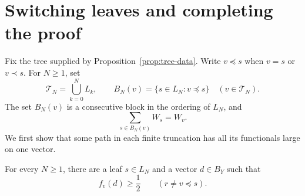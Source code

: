\section{Switching leaves and completing the proof}
\label{sec:switching}

Fix the tree supplied by Proposition~\ref{prop:tree-data}.
Write $v\preceq s$ when $v=s$ or $v\prec s$.
For $N\geq 1$, set
\[
  \mathcal T_N=\bigcup_{k=0}^{N}L_k,
  \qquad
  B_N(v)=\{s\in L_N:v\preceq s\}
  \quad(v\in\mathcal T_N).
\]
The set $B_N(v)$ is a consecutive block in the ordering of $L_N$, and
\[
  \sum_{s\in B_N(v)}W_s=W_v.
\]
We first show that some path in each finite truncation has all its
functionals large on one vector.

\begin{proposition}
\label{prop:finite-witness}
For every $N\geq 1$, there are a leaf $s\in L_N$ and a vector $d\in B_Y$
such that
\[
  f_v(d)\geq \frac12
  \qquad
  (r\ne v\preceq s).
\]
\end{proposition}

